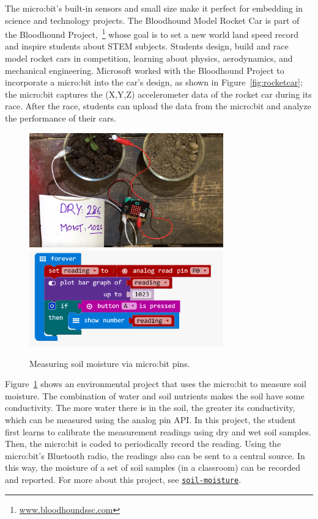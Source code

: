The micro:bit's built-in sensors and small size make it perfect for embedding
in science and technology projects.  The Bloodhound Model Rocket Car is 
part of the Bloodhound Project,~\footnote{\url{www.bloodhoundssc.com}} 
whose goal is to set a new world land speed
record and inspire students about STEM subjects. 
Students design, build and race model rocket cars in competition, learning about
physics, aerodynamics, and mechanical engineering. Microsoft worked with
the Bloodhound Project to incorporate a micro:bit into the car's design,
as shown in Figure~\ref{fig:rocketcar};
the micro:bit captures the (X,Y,Z) accelerometer data of the rocket car
during its race. After the race, students can upload the data from 
the micro:bit and analyze the performance of their cars. 

%


\begin{figure}[t]
    \includegraphics[width=3.3in]{images/moisture.jpg} 
    \includegraphics[width=3.3in]{images/moistureBlocks.png} 
    \caption{\label{fig:moisture}Measuring soil moisture via micro:bit pins.}
\end{figure}

Figure~\ref{fig:moisture} shows an environmental project that uses the 
micro:bit to measure soil moisture. The combination of water 
and soil nutrients makes the soil have some conductivity. The more water there is
in the soil, the greater its conductivity, which can be measured using
the analog pin API. In this project, the student
first learns to calibrate the measurement readings using dry and wet 
soil samples.  Then, the micro:bit is coded to periodically record the
reading. Using the micro:bit's Bluetooth radio, the readings also can
be sent to a central source.  In this way, the moisture of a set of soil
samples (in a classroom) can be recorded and reported. For more about this
project, 
see {\tt \href{http://makecode.microbit.org/projects/soil-moisture}{soil-moisture}}.

